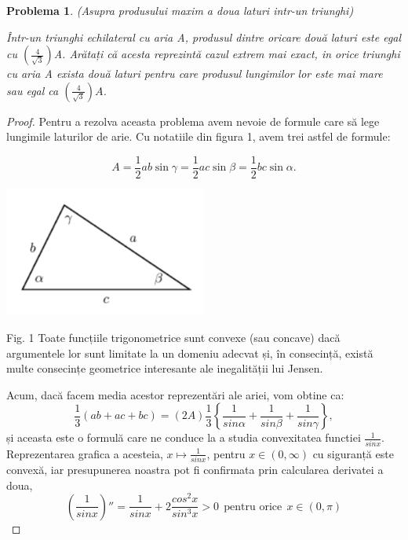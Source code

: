 \documentclass[a4paper,12pt,oneside]{report}
\newtheorem{problem}{Problema}
\begin{document}
\begin{problem}(Asupra produsului maxim a doua laturi intr-un triunghi)

Într-un triunghi echilateral cu aria A, produsul dintre oricare două laturi este egal cu \(\left (\frac{4}{\sqrt{3}}  \right )\)A. Arătați că acesta reprezintă cazul extrem mai exact, in orice triunghi cu aria A  exista două laturi pentru care produsul lungimilor lor este mai mare sau egal ca \(\left (\frac{4}{\sqrt{3}}  \right )A\).
\end{problem}
\begin{proof}
	Pentru a rezolva aceasta problema avem nevoie de formule care să lege lungimile laturilor de arie. Cu notatiile din figura 1, avem trei astfel de formule:

\begin{displaymath}
  A = \frac{1}{2}ab \sin\gamma = \frac{1}{2}ac \sin \beta = \frac{1}{2}bc \sin \alpha.
\end{displaymath}
\begin{center}
    \includegraphics[width=0.5\textwidth]{fig2.1.png}
\end{center}

Fig. 1  Toate funcțiile trigonometrice sunt convexe (sau concave) dacă
argumentele lor sunt limitate la un domeniu adecvat și, în consecință,
există multe consecințe geometrice interesante ale inegalității lui Jensen.


Acum, dacă facem media acestor reprezentări ale ariei, vom obtine ca:
\begin{displaymath}
  \frac{1}{3}\left ( ab + ac + bc \right )= \left ( 2A \right )\frac{1}{3}\left \{ \frac{1}{sin \alpha } + \frac{1}{sin \beta } + \frac{1}{sin \gamma }\right \}, \label{eq:2.1} \tag{2.1}
\end{displaymath}
și aceasta este o formulă care ne conduce la a studia convexitatea functiei \(\frac{1}{sin x}\). Reprezentarea grafica a acesteia, \(x \mapsto \frac{1}{sin x}\), pentru \(x\in \left ( 0, \infty  \right )\) cu siguranță este convexă, iar presupunerea noastra pot fi confirmata prin calcularea derivatei a doua,
\begin{displaymath}
  {\left ( \frac{1}{sin x} \right )}''= \frac{1}{sin x} + 2\frac{cos^{2}x}{sin ^{3}x}> 0~~ \text{pentru orice}~~ x\in \left ( 0, \pi  \right )  \label{eq:2.2} \tag{2.2}
\end{displaymath}


\end{proof}
\end{document}
